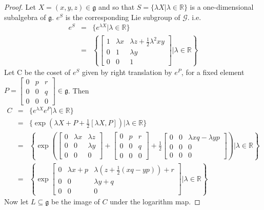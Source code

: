 \documentclass[honours]{UNSWthesis}
\newcommand{\R}{\mathbb{R}}
\newcommand{\G}{\mathcal{G}}
\newcommand{\g}{\mathfrak{g}}
\newcommand{\1}{\mathbf{e}_{1}}
\newcommand{\2}{\mathbf{e}_{3}}
\newcommand{\3}{\mathbf{e}_{3}}
\begin{document}
\begin{proof}
Let $X=(x,y,z) \in \g$ and so that $S=\{ \lambda X | \lambda \in \R \}$ is a one-dimensional subalgebra of $\g$. $e^{S}$ is the corresponding Lie subgroup of $\G$. i.e.
\begin{eqnarray*}
e^{S} &=& \{ e^{\lambda X}| \lambda \in \R \} \\
&=& \left\lbrace \begin{bmatrix}
1 & \lambda x & \lambda z + \frac{1}{2} \lambda^{2}xy \\
0 & 1 & \lambda y \\
0 & 0 & 1
\end{bmatrix} \bigg| \lambda \in \R \right\rbrace
\end{eqnarray*}
Let C be the coset of $e^{S}$ given by right translation by $e^{P}$, for a fixed element $P = \begin{bmatrix}
0 & p & r \\
0 & 0 & q \\
0 & 0 & 0
\end{bmatrix} \in \g$. Then 
\begin{eqnarray*}
C &=& \{e^{\lambda X}e^{P}|\lambda \in \R \} \\
&=& \{ \exp( \lambda X + P + \frac{1}{2}[\lambda X,P]) | \lambda \in \R \} \\
&=& \left\lbrace \exp \left( 
\begin{bmatrix}
0 & \lambda x & \lambda z \\
0 & 0 & \lambda y \\
0 & 0 & 0
\end{bmatrix} + 
\begin{bmatrix}
0 & p & r \\
0 & 0 & q \\
0 & 0 & 0
\end{bmatrix} + 
\frac{1}{2}
\begin{bmatrix}
0 & 0 & \lambda xq - \lambda yp \\
0 & 0 & 0 \\
0 & 0 & 0
\end{bmatrix}
\right)
 \bigg| \lambda \in \R \right\rbrace \\
&=& \left\lbrace \exp
\begin{bmatrix}
0 & \lambda x + p & \lambda (z+\frac{1}{2}(xq-yp))+r \\
0 & 0 & \lambda y +q \\
0 & 0 & 0
\end{bmatrix}
\bigg| \lambda \in \R \right\rbrace
\end{eqnarray*}
Now let $L \subseteq \g$ be the image of $C$ under the logarithm map.


\end{proof}
\end{document}
